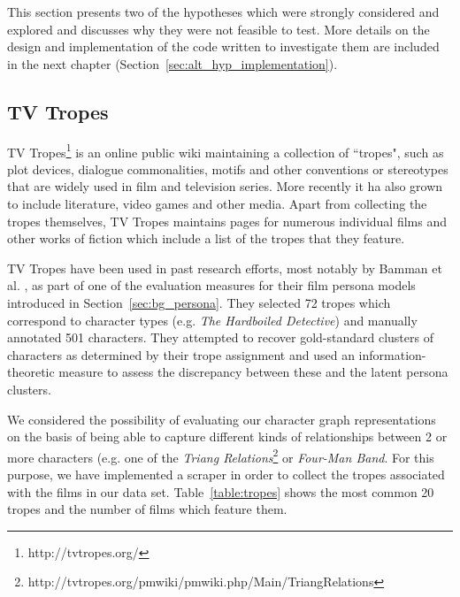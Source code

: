 \documentclass[bsc,frontabs,singlespacing,parskip, twoside]{infthesis}
\begin{document}
This section presents two of the hypotheses which were strongly considered and explored and discusses why they were not feasible to test. More details on the design and implementation of the code written to investigate them are included in the next chapter (Section~\ref{sec:alt_hyp_implementation}).

\subsection{TV Tropes}
\label{sec:alt_tropes}
TV Tropes\footnote{http://tvtropes.org/} is an online public wiki maintaining a collection of ``tropes", such as plot devices, dialogue commonalities, motifs and other conventions or stereotypes that are widely used in film and television series. More recently it ha also grown to include literature, video games and other media. Apart from collecting the tropes themselves, TV Tropes maintains pages for numerous individual films and other works of fiction which include a list of the tropes that they feature.

TV Tropes have been used in past research efforts, most notably by Bamman et al. \cite{Bamman2013}, as part of one of the evaluation measures for their film persona models introduced in Section~\ref{sec:bg_persona}. They selected 72 tropes which correspond to character types (e.g. \textit{The Hardboiled Detective}) and manually annotated 501 characters. They attempted to recover gold-standard clusters of characters as determined by their trope assignment and used an information-theoretic measure to assess the discrepancy between these and the latent persona clusters.

We considered the possibility of evaluating our character graph representations on the basis of being able to capture different kinds of relationships between 2 or more characters (e.g. one of the \textit{Triang Relations}\footnote{http://tvtropes.org/pmwiki/pmwiki.php/Main/TriangRelations} or \textit{Four-Man Band}. For this purpose, we have implemented a scraper in order to collect the tropes associated with the films in our data set. Table~\ref{table:tropes} shows the most common 20 tropes and the number of films which feature them.
\end{document}

